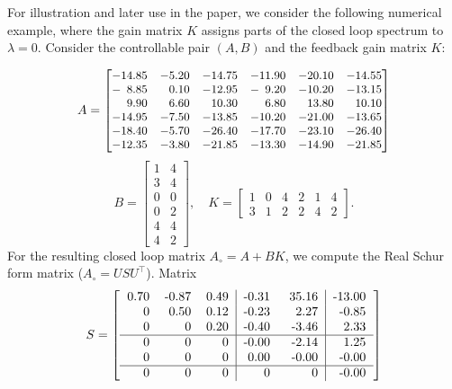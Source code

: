 \documentclass[journal,twoside,web]{ieeecolor}
\begin{document}
For illustration and later use in the paper, we consider the following numerical example, where the gain matrix $K$ assigns parts of the closed loop spectrum to $\lambda=0$. Consider the controllable pair $(A,B)$ and the feedback gain matrix $K$: 

\[
{\small
A = \begin{bmatrix}
-14.85 & -5.20 & -14.75 & -11.90 & -20.10 & -14.55 \\
-\hphantom{0}8.85 & \hphantom{-}0.10 & -12.95 & -\hphantom{0}9.20 & -10.20 & -13.15 \\
\hphantom{-0}9.90 & \hphantom{-}6.60 & \hphantom{-}10.30 & \hphantom{-0}6.80 & \hphantom{-}13.80 & \hphantom{-}10.10 \\
-14.95 & -7.50 & -13.85 & -10.20 & -21.00 & -13.65 \\
-18.40 & -5.70 & -26.40 & -17.70 & -23.10 & -26.40 \\
-12.35 & -3.80 & -21.85 & -13.30 & -14.90 & -21.85
\end{bmatrix}
}
\]
$$
B =
\begin{bmatrix}
1 & 4 \\
3 & 4 \\
0 & 0 \\
0 & 2 \\
4 & 4 \\
4 & 2
\end{bmatrix},
\quad K =
\begin{bmatrix}
1 & 0 & 4 & 2 & 1 & 4 \\
3 & 1 & 2 & 2 & 4 & 2
\end{bmatrix}.
$$
For the resulting closed loop matrix $A_\circ=A+BK$, we compute the Real Schur form matrix ($A_\circ = USU^\top$). Matrix
\[
S = \left[\begin{tabular}{ccc|cc|c}
0.70 & -0.87 & 0.49 & -0.31 & \hphantom{-}35.16 & -13.00 \\
\hphantom{0.0}0 & \hphantom{-}0.50 & 0.12 & -0.23 & \hphantom{-0}2.27 & \hphantom{0}-0.85 \\
\hphantom{0.0}0 & \hphantom{-0.0}0 & 0.20 & -0.40 & \hphantom{0}-3.46 & \hphantom{-0}2.33 \\
\hline
\hphantom{0.0}0 & \hphantom{-0.0}0 & \hphantom{0.0}0 & -0.00 & \hphantom{0}-2.14 & \hphantom{-0}1.25 \\
\hphantom{0.0}0 & \hphantom{-0.0}0 & \hphantom{0.0}0 & \hphantom{-}0.00 & \hphantom{0}-0.00 & \hphantom{0}-0.00 \\
\hline
\hphantom{0.0}0 & \hphantom{-0.0}0 & \hphantom{0.0}0 & \hphantom{-0.0}0 & \hphantom{-00.0}0 & \hphantom{0}-0.00
\end{tabular}\right]
\]
\end{document}

